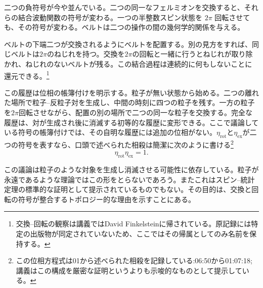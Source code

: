 二つの負符号が今や並んでいる。二つの同一なフェルミオンを交換すると、それらの結合波動関数の符号が変わる。一つの半整数スピン状態を \(2\pi\) 回転させても、その符号が変わる。ベルトは二つの操作の間の幾何学的関係を与える。

ベルトの下端二つが交換されるようにベルトを配置する。別の見方をすれば、同じベルトは\(2\pi\)のねじれを持つ。交換を\(2\pi\)の回転と一緒に行うとねじれが取り除かれ、ねじれのないベルトが残る。この結合過程は連続的に何もしないことに還元できる。\footnote{交換--回転の観察は講義ではDavid Finkelsteinに帰されている。原記録には特定の出版物が同定されていないため、ここではその帰属としてのみ名前を保持する。}

\begin{classroomqa}
\end{classroomqa}

この履歴は位相の帳簿付けを明示する。粒子が無い状態から始める。二つの離れた場所で粒子--反粒子対を生成し、中間の時刻に四つの粒子を残す。一方の粒子を\(2\pi\)回転させながら、配置の別の場所で二つの同一な粒子を交換する。完全な履歴は、対が生成され後に消滅する初等的な履歴に変形できる。ここで議論している符号の帳簿付けでは、その自明な履歴には追加の位相がない。\(\eta_{\mathrm{rot}}\)と\(\eta_{\mathrm{ex}}\)が二つの符号を表すなら、口頭で述べられた相殺は簡潔に次のように書ける\footnote{この位相方程式は01から述べられた相殺を記録している:06:50から01:07:18; 講義はこの構成を厳密な証明というよりも示唆的なものとして提示している。}
\begin{equation}
\eta_{\mathrm{rot}}\eta_{\mathrm{ex}}=1.
\end{equation}

\begin{classroomqa}
\end{classroomqa}

この議論は粒子のような対象を生成し消滅させる可能性に依存している。粒子が永遠であるような理論ではこの形をとらないであろう。またこれはスピン--統計定理の標準的な証明として提示されているものでもない。その目的は、交換と回転の符号が整合するトポロジー的な理由を示すことにある。

